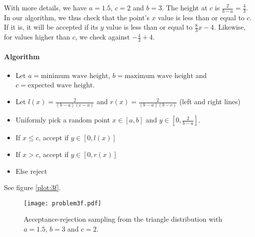 \documentclass[a4paper,english,12pt]{article}
\begin{document}
With more details, we have $a=1.5$, $c=2$ and $b=3$. The height at $c$ is
$\frac{2}{b-a} = \frac{4}{3}$. In our algorithm, we thus check that the point's $x$
value is less than or equal to $c$. If it is, it will be accepted if its $y$
value is less than or equal to $\frac{8}{3}x - 4$. Likewise, for values higher
than $c$, we check against $-\frac{4}{3} + 4$.

\paragraph{Algorithm}
\begin{itemize}
  \item Let $a=\text{minimum wave height}$, $b=\text{maximum wave height}$ and
    $c=\text{expected wave height}$.
  \item Let $l(x) = \frac{2}{(b-a)(c-a)}$  and $r(x) = \frac{2}{(b-a)(b-c)}$
    (left and right lines)
  \item Uniformly pick a random point $x \in [a, b]$ and $y \in [0, \frac{2}{b-a}]$.
  \item If $x \leqslant c$, accept if $y \in \left[0, l(x)\right]$
  \item If $x > c$, accept if $y \in \left[0, r(x)\right]$
  \item Else reject
\end{itemize}

See figure \vref{plot:3f}.

\begin{figure}
  \centering
  \texttt{[image: problem3f.pdf]}
  \caption{Acceptance-rejection sampling from the triangle distribution with
  $a=1.5$, $b=3$ and $c=2$.}
  \label{plot:3f}
\end{figure}




\end{document}
